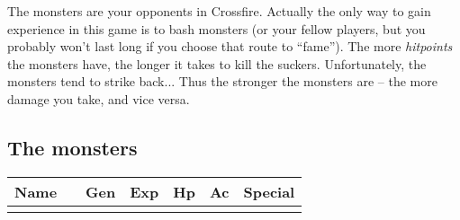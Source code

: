 \documentclass[11pt, a4paper]{article}
\begin{document}
The monsters are your opponents in Crossfire.  Actually the only way
to gain experience in this game is to bash monsters (or your fellow
players, but you probably won't last long if you choose that route to
``fame'').  The more {\it hitpoints} the monsters have, the longer it
takes to kill the suckers.  Unfortunately, the monsters tend to strike
back...  Thus the stronger the monsters are -- the more damage you
take, and vice versa.

{\small 
\subsection*{The monsters}
\begin{longtable}{|p{2cm}|c|c|r|r|r|p{5cm}|}
\hline
Name&&Gen&Exp&Hp&Ac&Special\\
\hline
\hline
\endhead
\hline
\endfoot

\end{longtable}
}
\end{document}
